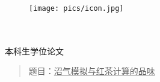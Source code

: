 \thispagestyle{empty}
\begin{figure}[t]
    \centering
    \texttt{[image: pics/icon.jpg]}
\end{figure}
\begin{center}
    \quad \\
    \quad \\
    \heiti\fontsize{40}{48}\selectfont 本科生学位论文
    \vspace{30mm}
\end{center}
\begin{quotation}
    {\heiti{}
        题目：\underline{\hspace*{1em}沼气模拟与红茶计算的品味\hspace*{1em}}
    }
\end{quotation}
\vspace{25mm}
